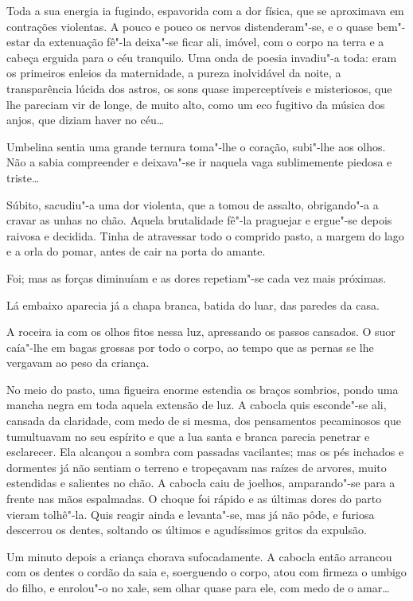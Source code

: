 Toda a sua energia ia fugindo, espavorida com a dor física, que se
aproximava em contrações violentas. A pouco e pouco os nervos
distenderam"-se, e o quase bem"-estar da extenuação fê"-la deixa"-se ficar
ali, imóvel, com o corpo na terra e a cabeça erguida para o céu
tranquilo. Uma onda de poesia invadiu"-a toda: eram os primeiros enleios
da maternidade, a pureza inolvidável da noite, a transparência lúcida
dos astros, os sons quase imperceptíveis e misteriosos, que lhe pareciam
vir de longe, de muito alto, como um eco fugitivo da música dos anjos,
que diziam haver no céu\ldots{}

Umbelina sentia uma grande ternura toma"-lhe o coração, subi"-lhe aos
olhos. Não a sabia compreender e deixava"-se ir naquela vaga sublimemente
piedosa e triste\ldots{}

Súbito, sacudiu"-a uma dor violenta, que a tomou de assalto, obrigando"-a
a cravar as unhas no chão. Aquela brutalidade fê"-la praguejar e
ergue"-se depois raivosa e decidida. Tinha de atravessar todo o comprido
pasto, a margem do lago e a orla do pomar, antes de cair na porta do
amante.

Foi; mas as forças diminuíam e as dores repetiam"-se cada vez mais
próximas.

Lá embaixo aparecia já a chapa branca, batida do luar, das paredes da
casa.

A roceira ia com os olhos fitos nessa luz, apressando os passos
cansados. O suor caía"-lhe em bagas grossas por todo o corpo, ao tempo
que as pernas se lhe vergavam ao peso da criança.

No meio do pasto, uma figueira enorme estendia os braços sombrios, pondo
uma mancha negra em toda aquela extensão de luz. A cabocla quis
esconde"-se ali, cansada da claridade, com medo de si mesma, dos
pensamentos pecaminosos que tumultuavam no seu espírito e que a lua
santa e branca parecia penetrar e esclarecer. Ela alcançou a sombra com
passadas vacilantes; mas os pés inchados e dormentes já não sentiam o
terreno e tropeçavam nas raízes de arvores, muito estendidas e salientes
no chão. A cabocla caiu de joelhos, amparando"-se para a frente nas mãos
espalmadas. O choque foi rápido e as últimas dores do parto vieram
tolhê"-la. Quis reagir ainda e levanta"-se, mas já não pôde, e furiosa
descerrou os dentes, soltando os últimos e agudíssimos gritos da
expulsão.

Um minuto depois a criança chorava sufocadamente. A cabocla então
arrancou com os dentes o cordão da saia e, soerguendo o corpo, atou com
firmeza o umbigo do filho, e enrolou"-o no xale, sem olhar quase para
ele, com medo de o amar\ldots{}

